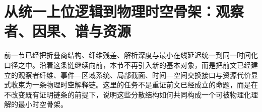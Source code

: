 \section{从统一上位逻辑到物理时空骨架：观察者、因果、谱与资源}\label{sec:physical-spacetime-skeleton}

前一节已经把折叠商结构、纤维残差、解析深度与最小在线延迟统一到同一时间化口径之中。沿着这条链继续向前，本节不再引入新的基本对象，而是把前文已经建立的观察者纤维、事件—区域系统、局部截面、时间—空间交换接口与资源代价显式收束为一条物理时空解释链。这里的任务不是重证前文已经成立的命题，而是在不改变既有证明链条的前提下，说明这些分散结构如何共同构成一个可被物理化理解的最小时空骨架。












